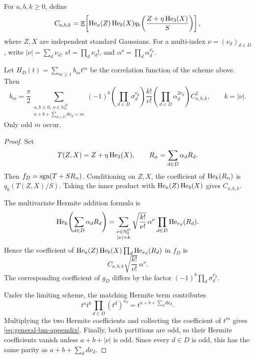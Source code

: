 For \(a,b,k\geq 0\), define
\begin{equation}
    C_{a,b,k}
    =
    \mathop{\mathbb{E}}\!\left[
        \operatorname{He}_a(Z)\operatorname{He}_b(X)
        q_k\!\left(
            \frac{Z+\eta\operatorname{He}_3(X)}{S}
        \right)
    \right],
    \label{eq:general-Cabk}
\end{equation}
where \(Z,X\) are independent standard Gaussians. For a multi-index
\(\nu=(\nu_d)_{d\in D}\), write
\(
|\nu|=\sum_d\nu_d
\),
\(
\nu!=\prod_d\nu_d!
\), and
\(
\alpha^\nu=\prod_d\alpha_d^{\nu_d}
\).

\begin{proposition}
\label{prop:general-degree-formula}
Let
\(
H_D(t)=\sum_{m\geq 1}b_m t^m
\)
be the correlation function of the scheme above. Then
\begin{equation}
    b_m
    =
    \frac{\pi}{2}
    \sum_{\substack{a,b\geq 0,\ \nu\in\mathbb{N}_0^D\\
          a+b+\sum_{d\in D}d\nu_d=m}}
    (-1)^b
    \left(\prod_{d\in D}\sigma_d^{\nu_d}\right)
    \frac{k!}{\nu!}
    \left(\prod_{d\in D}\alpha_d^{2\nu_d}\right)
    C_{a,b,k}^2,
    \qquad
    k=|\nu|.
    \label{eq:general-bm-appendix}
\end{equation}
Only odd \(m\) occur.
\end{proposition}

\begin{proof}
Set
\[
    T(Z,X)=Z+\eta\operatorname{He}_3(X),
    \qquad
    R_\alpha=\sum_{d\in D}\alpha_dR_d.
\]
Then \(f_D=\operatorname{sgn}(T+SR_\alpha)\). Conditioning on \(Z,X\), the coefficient
of \(\operatorname{He}_k(R_\alpha)\) is
\(
q_k(T(Z,X)/S)
\). Taking the inner product with
\(\operatorname{He}_a(Z)\operatorname{He}_b(X)\) gives \(C_{a,b,k}\).

The multivariate Hermite addition formula is
\[
    \operatorname{He}_k\!\left(\sum_{d\in D}\alpha_dR_d\right)
    =
    \sum_{\substack{\nu\in\mathbb{N}_0^D\\|\nu|=k}}
    \sqrt{\frac{k!}{\nu!}}\,
    \alpha^\nu
    \prod_{d\in D}\operatorname{He}_{\nu_d}(R_d).
\]
Hence the coefficient of
\(
\operatorname{He}_a(Z)\operatorname{He}_b(X)\prod_d\operatorname{He}_{\nu_d}(R_d)
\)
in \(f_D\) is
\[
    C_{a,b,k}
    \sqrt{\frac{k!}{\nu!}}\,
    \alpha^\nu.
\]
The corresponding coefficient of \(g_D\) differs by the factor
\(
(-1)^b\prod_d\sigma_d^{\nu_d}
\).

Under the limiting scheme, the matching Hermite term contributes
\[
    t^a t^b\prod_{d\in D}(t^d)^{\nu_d}
    =
    t^{a+b+\sum_d d\nu_d}.
\]
Multiplying the two Hermite coefficients and collecting the coefficient
of \(t^m\) gives \eqref{eq:general-bm-appendix}. Finally, both partitions
are odd, so their Hermite coefficients vanish unless
\(a+b+|\nu|\) is odd. Since every \(d\in D\) is odd, this has the same
parity as \(a+b+\sum_d d\nu_d\).
\end{proof}


